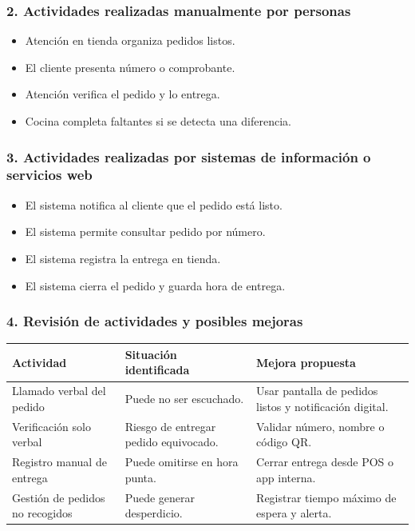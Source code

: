 \documentclass[a4paper,12pt]{article}
\begin{document}
\subsubsection*{2. Actividades realizadas manualmente por personas}

\begin{itemize}
    \item Atención en tienda organiza pedidos listos.
    \item El cliente presenta número o comprobante.
    \item Atención verifica el pedido y lo entrega.
    \item Cocina completa faltantes si se detecta una diferencia.
\end{itemize}

\subsubsection*{3. Actividades realizadas por sistemas de información o servicios web}

\begin{itemize}
    \item El sistema notifica al cliente que el pedido está listo.
    \item El sistema permite consultar pedido por número.
    \item El sistema registra la entrega en tienda.
    \item El sistema cierra el pedido y guarda hora de entrega.
\end{itemize}

\subsubsection*{4. Revisión de actividades y posibles mejoras}

\begin{longtable}{P{5cm} P{4cm} P{5cm}}
\toprule
\textbf{Actividad} & \textbf{Situación identificada} & \textbf{Mejora propuesta} \\
\midrule
Llamado verbal del pedido & Puede no ser escuchado. & Usar pantalla de pedidos listos y notificación digital. \\
Verificación solo verbal & Riesgo de entregar pedido equivocado. & Validar número, nombre o código QR. \\
Registro manual de entrega & Puede omitirse en hora punta. & Cerrar entrega desde POS o app interna. \\
Gestión de pedidos no recogidos & Puede generar desperdicio. & Registrar tiempo máximo de espera y alerta. \\
\bottomrule
\end{longtable}
\end{document}
